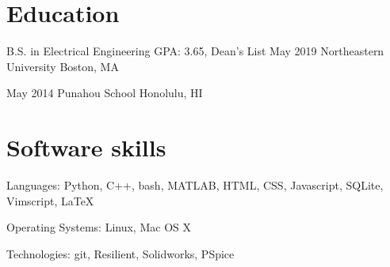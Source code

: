 \documentclass{tccv}
\begin{document}
\section{Education}

\begin{yearlist}

\item[B.S. in Electrical Engineering \newline GPA: 3.65, Dean's List]{May 2019}
     {Northeastern University}
     {Boston, MA}

\item{May 2014}
     {Punahou School}
     {Honolulu, HI}

\end{yearlist}

\section{Software skills}

\begin{factlist}

\item{Languages:}
     {Python, C++, bash, MATLAB, HTML, CSS, Javascript, SQLite, Vimscript, LaTeX}

\item{Operating Systems:}
     {Linux, Mac OS X}

\item{Technologies:}
     {git, Resilient, Solidworks, PSpice}

\end{factlist}
\end{document}
